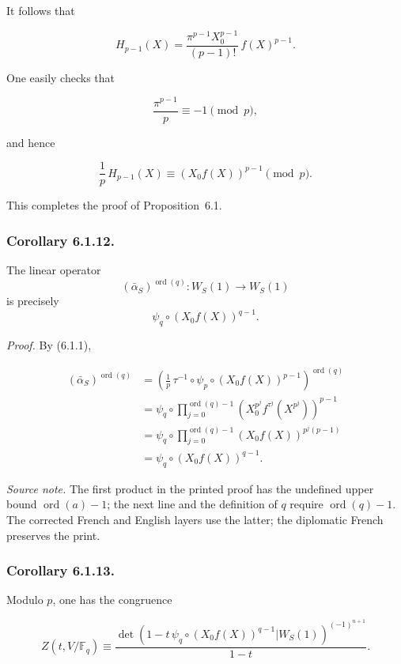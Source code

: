 It follows that

\begin{equation}\tag{6.1.9}
H_{p-1}(X)
=\frac{\pi^{p-1}X_0^{p-1}}{(p-1)!}\,f(X)^{p-1}.
\end{equation}

One easily checks that

\begin{equation}\tag{6.1.10}
\frac{\pi^{p-1}}p\equiv-1\pmod p,
\end{equation}

and hence

\begin{equation}\tag{6.1.11}
\frac1p\,H_{p-1}(X)
\equiv(X_0f(X))^{p-1}\pmod p.
\end{equation}

This completes the proof of Proposition~6.1.

\subsubsection*{Corollary 6.1.12.}
The linear operator
\[
(\bar\alpha_S)^{\operatorname{ord}(q)}:W_S(1)\longrightarrow W_S(1)
\]
is precisely
\[
\psi_q\circ(X_0f(X))^{q-1}.
\]

\noindent\emph{Proof.}
By (6.1.1),

\begin{equation*}
\begin{aligned}
(\bar\alpha_S)^{\operatorname{ord}(q)}
&=
\left(
\frac1p\,\tau^{-1}\circ\psi_p\circ(X_0f(X))^{p-1}
\right)^{\operatorname{ord}(q)}\\
&=
\psi_q\circ
\prod_{j=0}^{\operatorname{ord}(q)-1}
\left(X_0^{p^j}f^{\tau^j}(X^{p^j})\right)^{p-1}\\
&=
\psi_q\circ
\prod_{j=0}^{\operatorname{ord}(q)-1}
(X_0f(X))^{p^j(p-1)}\\
&=\psi_q\circ(X_0f(X))^{q-1}.
\end{aligned}
\end{equation*}

\medskip
\noindent\emph{Source note.}
The first product in the printed proof has the undefined upper bound
$\operatorname{ord}(a)-1$; the next line and the definition of $q$ require
$\operatorname{ord}(q)-1$.  The corrected French and English layers use
the latter; the diplomatic French preserves the print.

\subsubsection*{Corollary 6.1.13.}
Modulo $p$, one has the congruence

\begin{equation*}
Z(t,V/\mathbb F_q)
\equiv
\frac{
\det\!\left(
1-t\,\psi_q\circ(X_0f(X))^{q-1}
\mathrel{\Big|}W_S(1)
\right)^{(-1)^{n+1}}
}{1-t}.
\end{equation*}

